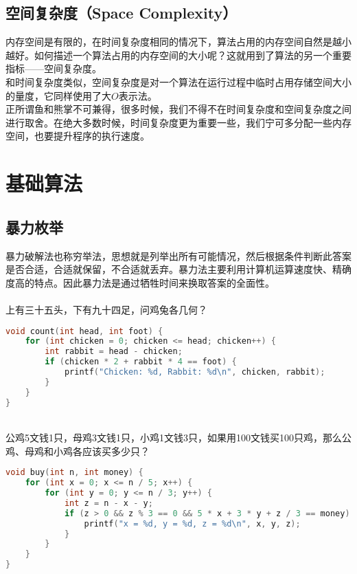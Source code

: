 \subsection{空间复杂度（Space Complexity）}

内存空间是有限的，在时间复杂度相同的情况下，算法占用的内存空间自然是越小越好。如何描述一个算法占用的内存空间的大小呢？这就用到了算法的另一个重要指标——空间复杂度。\\

和时间复杂度类似，空间复杂度是对一个算法在运行过程中临时占用存储空间大小的量度，它同样使用了大$ O $表示法。\\

正所谓鱼和熊掌不可兼得，很多时候，我们不得不在时间复杂度和空间复杂度之间进行取舍。在绝大多数时候，时间复杂度更为重要一些，我们宁可多分配一些内存空间，也要提升程序的执行速度。

\newpage

\section{基础算法}

\subsection{暴力枚举}

暴力破解法也称穷举法，思想就是列举出所有可能情况，然后根据条件判断此答案是否合适，合适就保留，不合适就丢弃。暴力法主要利用计算机运算速度快、精确度高的特点。因此暴力法是通过牺牲时间来换取答案的全面性。\\

\\

上有三十五头，下有九十四足，问鸡兔各几何？

\begin{lstlisting}[language=C]
void count(int head, int foot) {
	for (int chicken = 0; chicken <= head; chicken++) {
		int rabbit = head - chicken;
		if (chicken * 2 + rabbit * 4 == foot) {
			printf("Chicken: %d, Rabbit: %d\n", chicken, rabbit);
		}
	}
}
\end{lstlisting}

\vspace{0.5cm}

\\

公鸡5文钱1只，母鸡3文钱1只，小鸡1文钱3只，如果用100文钱买100只鸡，那么公鸡、母鸡和小鸡各应该买多少只？

\begin{lstlisting}[language=C]
void buy(int n, int money) {
	for (int x = 0; x <= n / 5; x++) {
		for (int y = 0; y <= n / 3; y++) {
			int z = n - x - y;
			if (z > 0 && z % 3 == 0 && 5 * x + 3 * y + z / 3 == money) {
				printf("x = %d, y = %d, z = %d\n", x, y, z);
			}
		}
	}
}
\end{lstlisting}


